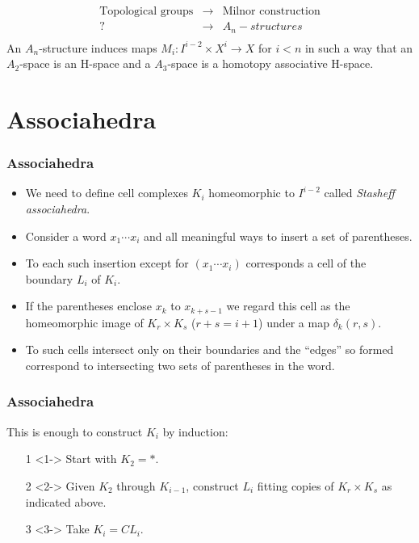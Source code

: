 \documentclass{beamer}
\theoremstyle{definition}
\begin{document}
\begin{frame}
\[
\begin{array}{ccc}
\text{Topological groups} & \rightarrow & \text{Milnor construction}\\
? & \rightarrow  & A_n-structures\\
& &
\end{array}
\]
\pause
An $A_n$-structure induces maps $M_i:I^{i-2}\times X^i\to X$ for $i<n$ in such a way that an $A_2$-space is an H-space and a $A_3$-space is a homotopy associative H-space. %
\end{frame}
\section{Associahedra}
\begin{frame}
\frametitle{Associahedra}
\begin{itemize}
\item<1->We need to define cell complexes $K_i$ homeomorphic to $I^{i-2}$ called \emph{Stasheff associahedra}. %
\item<2-> Consider a word $x_1\cdots x_i$ and all meaningful ways to insert a set of parentheses.
\item<3-> To each such insertion except for $(x_1\cdots x_i)$ corresponds a cell of the boundary $L_i$ of $K_i$.
\item<4-> If the parentheses enclose $x_k$ to $x_{k+s-1}$ we regard this cell as the homeomorphic image of $K_r\times K_s$ ($r+s=i+1$) under a map $\delta_k(r,s)$.
\item<5-> To such cells intersect only on their boundaries and the ``edges'' so formed correspond to intersecting two sets of parentheses in the word. %
 \end{itemize}
\end{frame}



\begin{frame}
\frametitle{Associahedra}
This is enough to construct $K_i$ by induction:
\begin{itemize}
\item[1]<1-> Start with $K_2=*$.
\item[2]<2-> Given $K_2$ through $K_{i-1}$, construct $L_i$ fitting copies of $K_r\times K_s$ as indicated above.
\item[3]<3-> Take $K_i=CL_i$.
\end{itemize}
\end{frame}
\end{document}
